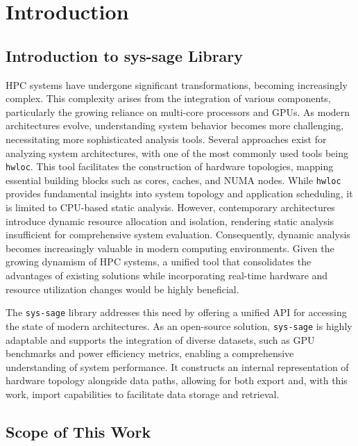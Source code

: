 
\chapter{Introduction}\label{chapter:introduction}
\section{Introduction to sys-sage Library}

\ac{HPC} systems have undergone significant transformations, becoming increasingly complex. This complexity arises from the integration of various components, particularly the growing reliance on multi-core processors and \ac{GPU}s. As modern architectures evolve, understanding system behavior becomes more challenging, necessitating more sophisticated analysis tools. Several approaches exist for analyzing system architectures, with one of the most commonly used tools being \texttt{hwloc}. This tool facilitates the construction of hardware topologies, mapping essential building blocks such as cores, caches, and \ac{NUMA} nodes. While \texttt{hwloc} provides fundamental insights into system topology and application scheduling, it is limited to \ac{CPU}-based static analysis. However, contemporary architectures introduce dynamic resource allocation and isolation, rendering static analysis insufficient for comprehensive system evaluation. Consequently, dynamic analysis becomes increasingly valuable in modern computing environments. Given the growing dynamism of \ac{HPC} systems, a unified tool that consolidates the advantages of existing solutions while incorporating real-time hardware and resource utilization changes would be highly beneficial. \cite{sys-sage} \cite{numa}

The \texttt{sys-sage} library addresses this need by offering a unified \ac{API} for accessing the state of modern architectures. As an open-source solution, \texttt{sys-sage} is highly adaptable and supports the integration of diverse datasets, such as \ac{GPU} benchmarks and power efficiency metrics, enabling a comprehensive understanding of system performance. It constructs an internal representation of hardware topology alongside data paths, allowing for both export and, with this work, import capabilities to facilitate data storage and retrieval. \cite{sys-sage} \cite{py-c-api}

\section{Scope of This Work}

